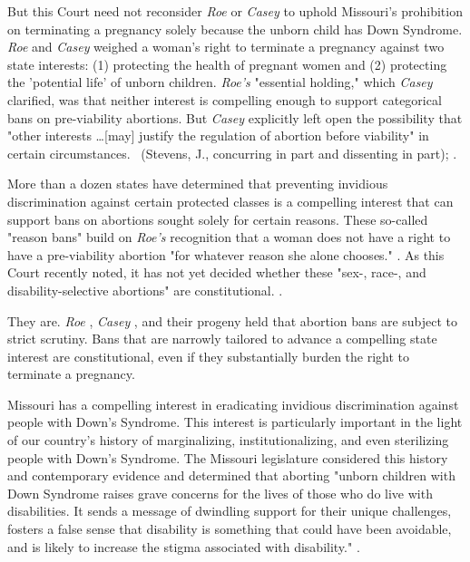 \documentclass[12pt,\documentclassflag]{SCOTUS_Brief}
\begin{document}
But this Court need not reconsider \textit{Roe} or \textit{Casey} \cite[!]{Casey} to uphold Missouri's prohibition on terminating a pregnancy solely because the unborn child has Down Syndrome. \textit{Roe} \cite[!]{Roe} and \textit{Casey} \cite[!]{Casey} weighed a woman's right to terminate a pregnancy against two state interests: (1) protecting the health of pregnant women and (2) protecting the 'potential life' of unborn children. \textit{Roe's} "essential holding," which \textit{Casey} clarified, was that neither interest is compelling enough to support categorical bans on pre-viability abortions. But \textit{Casey} explicitly left open the possibility that "other interests \ldots  [may] justify the regulation of abortion before viability" in certain circumstances. ~(Stevens, J., concurring in part and dissenting in part); \seealso \cite{Marks}.

More than a dozen states have determined that preventing invidious discrimination against certain protected classes is a compelling interest that can support bans on abortions sought solely for certain reasons. These so-called "reason bans" build on \textit{Roe's} \cite[!]{Roe} recognition that a woman does not have a right to have a pre-viability abortion "for whatever reason she alone chooses." . As this Court recently noted, it has not yet decided whether these "sex-, race-, and disability-selective abortions" are constitutional. .

They are. \textit{Roe} \cite[!]{Roe}, \textit{Casey} \cite[!]{Casey}, and their progeny held that abortion bans are subject to strict scrutiny. Bans that are narrowly tailored to advance a compelling state interest are constitutional, even if they substantially burden the right to terminate a pregnancy. 

Missouri has a compelling interest in eradicating invidious discrimination against people with Down's Syndrome. This interest is particularly important in the light of our country's history of marginalizing, institutionalizing, and even sterilizing people with Down's Syndrome. The Missouri legislature considered this history and contemporary evidence and determined that aborting "unborn children with Down Syndrome raises grave concerns for the lives of those who do live with disabilities. It sends a message of dwindling support for their unique challenges, fosters a false sense that disability is something that could have been avoidable, and is likely to increase the stigma associated with disability." .
\end{document}
